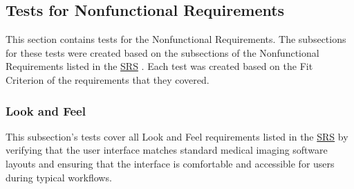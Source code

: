 \documentclass[12pt, titlepage]{article}
\begin{document}
\subsection{Tests for Nonfunctional Requirements}

This section contains tests for the Nonfunctional Requirements. The subsections for these tests were created based on the subsections of the Nonfunctional Requirements listed in the \href{https://github.com/RezaJodeiri/CXR-Capstone/blob/main/docs/SRS/SRS.pdf}{SRS} \citep{SRS}
. Each test was created based on the Fit Criterion of the requirements that they covered.

\subsubsection{Look and Feel}

This subsection's tests cover all Look and Feel requirements listed in the \href{https://github.com/RezaJodeiri/CXR-Capstone/blob/main/docs/SRS/SRS.pdf}{SRS} \citep{SRS}
 by verifying that the user interface matches standard medical imaging software layouts and ensuring that the interface is comfortable and accessible for users during typical workflows.
\end{document}
